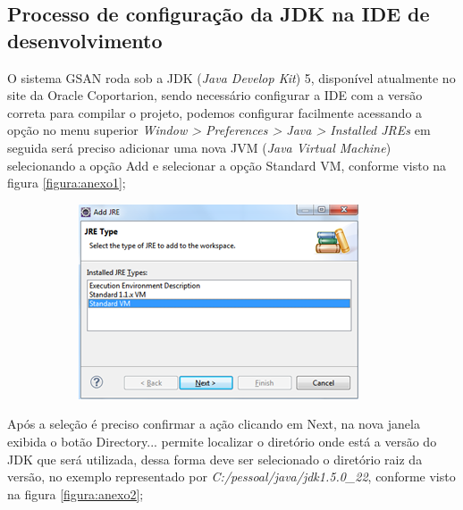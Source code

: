 \begin{apendicesenv}
	
	\partapendices

\chapter{Processo de configuração da JDK na IDE de desenvolvimento}

O sistema GSAN roda sob a JDK (\textit{Java Develop Kit}) 5, disponível atualmente no site da Oracle Coportarion, sendo necessário configurar a IDE com a versão correta para compilar o projeto, podemos configurar facilmente acessando a opção no menu superior \textit{Window > Preferences > Java > Installed JREs} em seguida será preciso adicionar uma nova JVM (\textit{Java Virtual Machine}) selecionando a opção Add e selecionar a opção Standard VM, conforme visto na figura \ref{figura:anexo1};

\begin{figure}[H]
	\centering
	\caption*{\textbf{Selecionar Tipo de JVM.}}
	\label{figura:anexo1}
	\begin{subfigure}[H]{\textwidth}
		\centering
		\includegraphics{figuras/anexo/selectJVM.png}
	\end{subfigure}
\end{figure}


Após a seleção é preciso confirmar a ação clicando em Next, na nova janela exibida o botão Directory... permite localizar o diretório onde está a versão do JDK que será utilizada, dessa forma deve ser selecionado o diretório raiz da versão, no exemplo representado por \textit{C:/pessoal/java/jdk1.5.0\_22}, conforme visto na figura \ref{figura:anexo2};


\end{apendicesenv}
